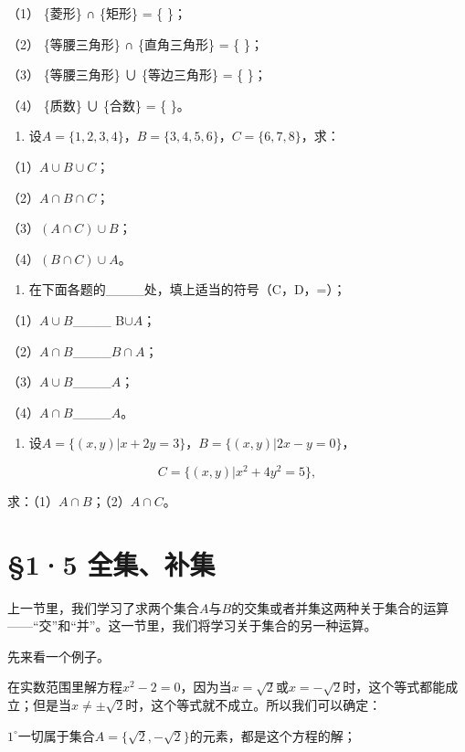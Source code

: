 （1） \{菱形\} ∩ \{矩形\} = \{ \}；

（2） \{等腰三角形\} ∩ \{直角三角形\} = \{ \}；

（3） \{等腰三角形\} ∪ \{等边三角形\} = \{ \}；

（4） \{质数\} ∪ \{合数\} = \{ \}。

\begin{enumerate}[start=2]
\item
  设\(A = \{1, 2, 3, 4\}\)，\(B = \{3, 4, 5, 6\}\)，\(C = \{6, 7, 8\}\)，求：
\end{enumerate}

（1）\(A \cup B \cup C\)；

（2）\(A \cap B \cap C\)；

（3）\((A \cap C) \cup B\)；

（4）\((B \cap C) \cup A\)。

\begin{enumerate}[start=3]
\item
  在下面各题的\_\_\_\_处，填上适当的符号（C，D，=）；
\end{enumerate}

（1）\(A \cup B\)\_\_\_\_ B\(\cup A\)；

（2）\(A \cap B\)\_\_\_\_\(B \cap A\)；

（3）\(A \cup B\)\_\_\_\_\(A\)；

（4）\(A \cap B\)\_\_\_\_\(A\)。

\begin{enumerate}[start=4]
\item
  设\(A = \{(x, y) | x + 2y = 3\}\)，\(B = \{(x, y) | 2x - y = 0\}\)，
\end{enumerate}

\[
C = \{(x, y) | x^{2} + 4 y^{2} = 5 \},
\]

求：（1）\(A \cap B\)；（2）\(A \cap C\)。

\section{§1·5 全集、补集}

上一节里，我们学习了求两个集合\(A\)与\(B\)的交集或者并集这两种关于集合的运算------``交''和``并''。这一节里，我们将学习关于集合的另一种运算。

先来看一个例子。

在实数范围里解方程\(x^{2} - 2 = 0\)，因为当\(x = \sqrt{2}\)或\(x = -\sqrt{2}\)时，这个等式都能成立；但是当\(x \neq \pm \sqrt{2}\)时，这个等式就不成立。所以我们可以确定：

\(1^{\circ}\)一切属于集合\(A = \{\sqrt{2}, -\sqrt{2}\}\)的元素，都是这个方程的解；

